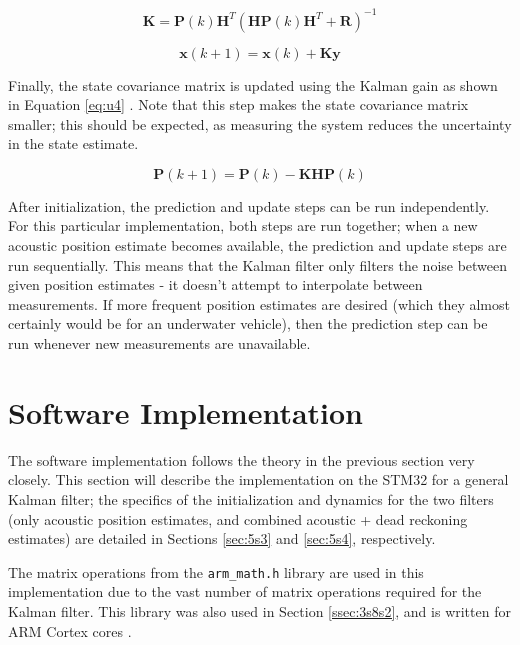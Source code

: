 \documentclass[12pt,a4paper]{report}
\begin{document}
\begin{equation} \label{eq:u2}
	\mathbf{K} = \mathbf{P}(k) \mathbf{H}^T (\mathbf{H} \mathbf{P}(k) \mathbf{H}^T + \mathbf{R})^{-1} 
\end{equation}

\begin{equation} \label{eq:u3}
	\mathbf{x}(k+1) = \mathbf{x}(k) + \mathbf{K} \mathbf{y}
\end{equation}

Finally, the state covariance matrix is updated using the Kalman gain as shown in Equation \ref{eq:u4} \cite{kfsimply}. Note that this step makes the state covariance matrix smaller; this should be expected, as measuring the system reduces the uncertainty in the state estimate.

\begin{equation} \label{eq:u4}
	\mathbf{P}(k+1) = \mathbf{P}(k) - \mathbf{K} \mathbf{H} \mathbf{P}(k)
\end{equation}

After initialization, the prediction and update steps can be run independently. For this particular implementation, both steps are run together; when a new acoustic position estimate becomes available, the prediction and update steps are run sequentially. This means that the Kalman filter only filters the noise between given position estimates - it doesn’t attempt to interpolate between measurements. If more frequent position estimates are desired (which they almost certainly would be for an underwater vehicle), then the prediction step can be run whenever new measurements are unavailable.

\section{Software Implementation} \label{sec:5s2}
The software implementation follows the theory in the previous section very closely. This section will describe the implementation on the STM32 for a general Kalman filter; the specifics of the initialization and dynamics for the two filters (only acoustic position estimates, and combined acoustic + dead reckoning estimates) are detailed in Sections \ref{sec:5s3} and \ref{sec:5s4}, respectively.

The matrix operations from the \verb|arm_math.h| library are used in this implementation due to the vast number of matrix operations required for the Kalman filter. This library was also used in Section \ref{ssec:3s8s2}, and is written for ARM Cortex cores \cite{arm}.
\end{document}
